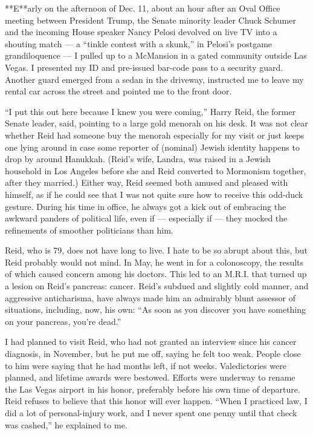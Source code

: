 **E**arly on the afternoon of Dec. 11, about an hour after an Oval
Office meeting between President Trump, the Senate minority leader Chuck
Schumer and the incoming House speaker Nancy Pelosi devolved on live TV
into a shouting match --- a ``tinkle contest with a skunk,'' in Pelosi's
postgame grandiloquence --- I pulled up to a McMansion in a gated
community outside Las Vegas. I presented my ID and pre-issued bar-code
pass to a security guard. Another guard emerged from a sedan in the
driveway, instructed me to leave my rental car across the street and
pointed me to the front door.

``I put this out here because I knew you were coming,'' Harry Reid, the
former Senate leader, said, pointing to a large gold menorah on his
desk. It was not clear whether Reid had someone buy the menorah
especially for my visit or just keeps one lying around in case some
reporter of (nominal) Jewish identity happens to drop by around
Hanukkah. (Reid's wife, Landra, was raised in a Jewish household in Los
Angeles before she and Reid converted to Mormonism together, after they
married.) Either way, Reid seemed both amused and pleased with himself,
as if he could see that I was not quite sure how to receive this
odd-duck gesture. During his time in office, he always got a kick out of
embracing the awkward panders of political life, even if --- especially
if --- they mocked the refinements of smoother politicians than him.

Reid, who is 79, does not have long to live. I hate to be so abrupt
about this, but Reid probably would not mind. In May, he went in for a
colonoscopy, the results of which caused concern among his doctors. This
led to an M.R.I. that turned up a lesion on Reid's pancreas: cancer.
Reid's subdued and slightly cold manner, and aggressive anticharisma,
have always made him an admirably blunt assessor of situations,
including, now, his own: ``As soon as you discover you have something on
your pancreas, you're dead.''

I had planned to visit Reid, who had not granted an interview since his
cancer diagnosis, in November, but he put me off, saying he felt too
weak. People close to him were saying that he had months left, if not
weeks. Valedictories were planned, and lifetime awards were bestowed.
Efforts were underway to rename the Las Vegas airport in his honor,
preferably before his own time of departure. Reid refuses to believe
that this honor will ever happen. ``When I practiced law, I did a lot of
personal-injury work, and I never spent one penny until that check was
cashed,'' he explained to me.

